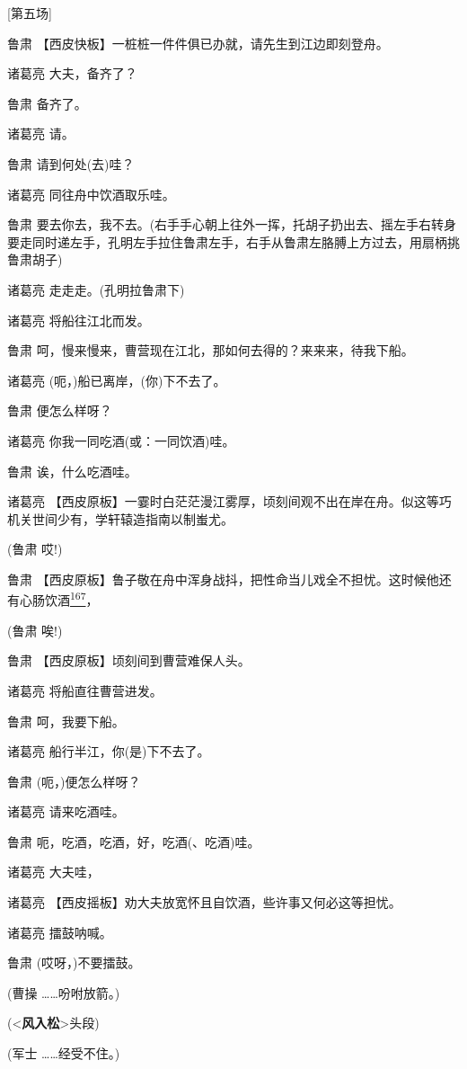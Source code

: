 {[}第五场{]}

鲁肃 【西皮快板】一桩桩一件件俱已办就，请先生到江边即刻登舟。

诸葛亮 大夫，备齐了？

鲁肃 备齐了。

诸葛亮 请。

鲁肃 请到何处(去)哇？

诸葛亮 同往舟中饮酒取乐哇。

鲁肃
要去你去，我不去。(右手手心朝上往外一挥，托胡子扔出去、摇左手右转身要走同时递左手，孔明左手拉住鲁肃左手，右手从鲁肃左胳膊上方过去，用扇柄挑鲁肃胡子)

诸葛亮 走走走。(孔明拉鲁肃下)

诸葛亮 将船往江北而发。

鲁肃 呵，慢来慢来，曹营现在江北，那如何去得的？来来来，待我下船。

诸葛亮 (呃，)船已离岸，(你)下不去了。

鲁肃 便怎么样呀？

诸葛亮 你我一同吃酒(或：一同饮酒)哇。

鲁肃 诶，什么吃酒哇。

诸葛亮
【西皮原板】一霎时白茫茫漫江雾厚，顷刻间观不出在岸在舟。似这等巧机关世间少有，学轩辕造指南以制蚩尤。

(鲁肃 哎!)

鲁肃
【西皮原板】鲁子敬在舟中浑身战抖，把性命当儿戏全不担忧。这时候他还有心肠饮酒\protect\hyperlink{fn167}{\textsuperscript{167}}，

(鲁肃 唉!)

鲁肃 【西皮原板】顷刻间到曹营难保人头。

诸葛亮 将船直往曹营进发。

鲁肃 呵，我要下船。

诸葛亮 船行半江，你(是)下不去了。

鲁肃 (呃，)便怎么样呀？

诸葛亮 请来吃酒哇。

鲁肃 呃，吃酒，吃酒，好，吃酒(、吃酒)哇。

诸葛亮 大夫哇，

诸葛亮 【西皮摇板】劝大夫放宽怀且自饮酒，些许事又何必这等担忧。

诸葛亮 擂鼓呐喊。

鲁肃 (哎呀，)不要擂鼓。

(曹操 \ldots{}\ldots{}吩咐放箭。)

(\textless{}\textbf{风入松}\textgreater{}头段)

(军士 \ldots{}\ldots{}经受不住。)

